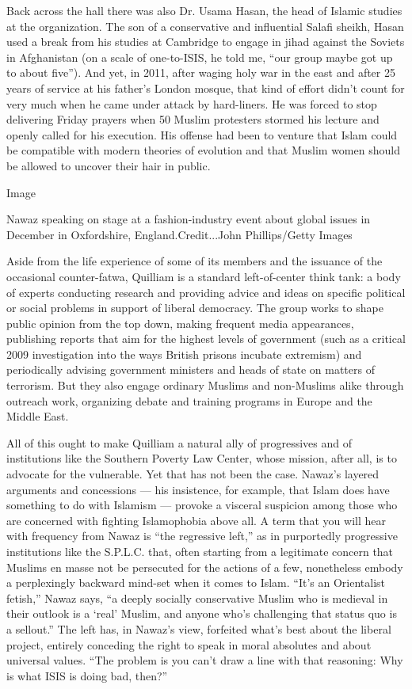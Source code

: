 Back across the hall there was also Dr. Usama Hasan, the head of Islamic
studies at the organization. The son of a conservative and influential
Salafi sheikh, Hasan used a break from his studies at Cambridge to
engage in jihad against the Soviets in Afghanistan (on a scale of
one-to-ISIS, he told me, ``our group maybe got up to about five''). And
yet, in 2011, after waging holy war in the east and after 25 years of
service at his father's London mosque, that kind of effort didn't count
for very much when he came under attack by hard-liners. He was forced to
stop delivering Friday prayers when 50 Muslim protesters stormed his
lecture and openly called for his execution. His offense had been to
venture that Islam could be compatible with modern theories of evolution
and that Muslim women should be allowed to uncover their hair in public.

Image

Nawaz speaking on stage at a fashion-industry event about global issues
in December in Oxfordshire, England.Credit...John Phillips/Getty Images

Aside from the life experience of some of its members and the issuance
of the occasional counter-fatwa, Quilliam is a standard left-of-center
think tank: a body of experts conducting research and providing advice
and ideas on specific political or social problems in support of liberal
democracy. The group works to shape public opinion from the top down,
making frequent media appearances, publishing reports that aim for the
highest levels of government (such as a critical 2009 investigation into
the ways British prisons incubate extremism) and periodically advising
government ministers and heads of state on matters of terrorism. But
they also engage ordinary Muslims and non-Muslims alike through outreach
work, organizing debate and training programs in Europe and the Middle
East.

All of this ought to make Quilliam a natural ally of progressives and of
institutions like the Southern Poverty Law Center, whose mission, after
all, is to advocate for the vulnerable. Yet that has not been the case.
Nawaz's layered arguments and concessions --- his insistence, for
example, that Islam does have something to do with Islamism --- provoke
a visceral suspicion among those who are concerned with fighting
Islamophobia above all. A term that you will hear with frequency from
Nawaz is ``the regressive left,'' as in purportedly progressive
institutions like the S.P.L.C. that, often starting from a legitimate
concern that Muslims en masse not be persecuted for the actions of a
few, nonetheless embody a perplexingly backward mind-set when it comes
to Islam. ``It's an Orientalist fetish,'' Nawaz says, ``a deeply
socially conservative Muslim who is medieval in their outlook is a
`real' Muslim, and anyone who's challenging that status quo is a
sellout.'' The left has, in Nawaz's view, forfeited what's best about
the liberal project, entirely conceding the right to speak in moral
absolutes and about universal values. ``The problem is you can't draw a
line with that reasoning: Why is what ISIS is doing bad, then?''

